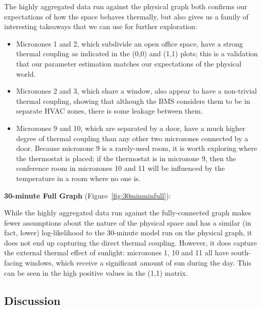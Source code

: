 The highly aggregated data run against the physical graph both confirms our expectations of how the space behaves thermally, but also gives us a family of interesting takeaways that we can use for further exploration:

\begin{itemize}[noitemsep,nolistsep]
\item Microzones 1 and 2, which subdivide an open office space, have a strong thermal coupling as indicated in the (0,0) and (1,1) plots; this is a validation that our parameter estimation matches our expectations of the physical world.
\item Microzones 2 and 3, which share a window, also appear to have a non-trivial thermal coupling, showing that although the BMS considers them to be in separate HVAC zones, there is some leakage between them.
\item Microzones 9 and 10, which are separated by a door, have a much higher degree of thermal coupling than any other two microzones connected by a door.
Because microzone 9 is a rarely-used room, it is worth exploring where the thermostat is placed; if the thermostat is in microzone 9, then the conference room in microzones 10 and 11 will be influenced by the temperature in a room where no one is.
\end{itemize}

\textbf{30-minute Full Graph} (Figure~\ref{fig:30minminfull}):

While the highly aggregated data run against the fully-connected graph makes fewer assumptions about the nature of the physical space and has a similar (in fact, lower) log-likelihood to the 30-minute model run on the physical graph, it does not end up capturing the direct thermal coupling.
However, it does capture the external thermal effect of sunlight: microzones 1, 10 and 11 all have south-facing windows, which receive a significant amount of sun during the day.
This can be seen in the high positive values in the (1,1) matrix.

\subsection{Discussion}

